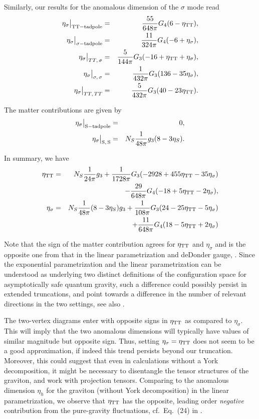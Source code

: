 \documentclass[11pt]{book} %
\newcommand{\bea}{\begin{eqnarray}}
\newcommand{\eea}{\end{eqnarray}}
\numberwithin{equation}{chapter}
\begin{document}
Similarly, our results for the anomalous dimension of the $\sigma$ mode read
\bea
\eta_{\sigma} \big|_{\rm TT-tadpole} &=& \frac{55}{648 \pi}G_4(6-\eta_{\rm TT}),\\
\eta_{\sigma}  \big|_{\sigma- \rm tadpole} &=& \frac{11}{324 \pi}G_4 (-6+\eta_{\sigma}) ,\\
\eta_{\sigma}  \big|_{TT,\,\sigma} &=& \frac{5}{144\pi}G_3 (-16+\eta_{\rm TT}+ \eta_{\sigma}) ,\\
\eta_{\sigma}  \big|_{\sigma,\,\sigma} &=&\frac{1}{432\pi}G_3 (136 - 35 \eta_{\sigma}),\\
\eta_{\sigma}  \big|_{TT,\,TT} &=& \frac{5}{432\pi}G_3(40-23\eta_{\rm TT}) .
\eea

The matter contributions are given by
\bea
\eta_{\sigma}\big|_{\rm S-tadpole}  &=& 0,\\
\eta_{\sigma}\big|_{\rm S,\,S}  &=& N_S  \frac{1}{48 \pi}g_3 (8-3\eta_S).
\eea

In summary, we have
\bea
\eta_{\rm TT}&=&N_S\frac{1}{24 \pi}g_3 + \frac{1}{1728 \pi} G_3 (-2928 + 455 \eta_{\rm TT} - 35 \eta_{\sigma}) \nonumber\\
&{}&- \frac{29}{648 \pi} G_4 (-18+5 \eta_{\rm TT} - 2 \eta_{\sigma}),\label{etaTTcomplete}\\
\eta_{\sigma}&=& N_S \frac{1}{48 \pi}(8-3 \eta_S)g_3 + \frac{1}{108 \pi} G_3 (24 - 25\eta_{\rm TT} - 5 \eta_{\sigma})\nonumber\\
&{}& +\frac{11}{648 \pi} G_4(18-5\eta_{\rm TT}+2\eta_{\sigma})
\label{etasigmacomplete}
\eea

Note that the sign of the matter contribution agrees for $\eta_{\rm TT}$ and $\eta_{\sigma}$
and is the opposite one from that in the linear parametrization and deDonder gauge,
\cite{Dona:2013qba}. Since the exponential parametrization and the linear parametrization
can be understood as underlying two distinct definitions of the configuration space for
asymptotically safe quantum gravity, such a difference could possibly persist in extended truncations,
and point towards a difference in the number of relevant directions in the two settings,
see also \cite{Ohta:2015efa}.

The two-vertex diagrams enter with opposite signs in $\eta_{\rm TT}$ as compared to $\eta_{\sigma}$.
This will imply that the two anomalous dimensions will typically have values of similar magnitude
but opposite sign. Thus, setting $\eta_{\sigma} = \eta_{\rm TT}$ does not seem to be a good approximation,
if indeed this trend persists beyond our truncation.
Moreover, this could suggest that even in calculations without a York decomposition,
it might be necessary to disentangle the tensor structures of the graviton,
and work with projection tensors.
Comparing to the anomalous dimension $\eta_h$ for the graviton (without York decomposition)
in the linear parametrization,
we observe that $\eta_{\rm TT}$ has the opposite,
leading order \emph{negative} contribution from the pure-gravity fluctuations,
cf.~Eq.~(24) in \cite{Dona:2013qba}.
\end{document}
